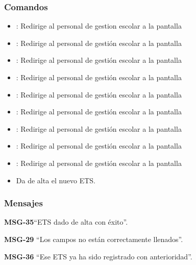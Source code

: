 \subsubsection{Comandos}
\begin{itemize}
	\item {}: Redirige al personal de gestion escolar a la pantalla 
	
	\item {}: Redirige al personal de gestión escolar a la pantalla 
	\item {}: Redirige al personal de gestión escolar a la pantalla 
	
	\item {}: Redirige al personal de gestión escolar a la pantalla 
	\item {}: Redirige al personal de gestión escolar a la pantalla 
	
	\item {}: Redirige al personal de gestión escolar a la pantalla 
	\item {}: Redirige al personal de gestión escolar a la pantalla 
	
	\item {}: Redirige al personal de gestión escolar a la pantalla 
	\item {}: Redirige al personal de gestión escolar a la pantalla 
	
    \item {} Da de alta el nuevo ETS.
\end{itemize}

\subsubsection{Mensajes}

\begin{Citemize}
    \item {\bf MSG-35}{``ETS  dado de alta con éxito''.}
    \item {\bf MSG-29}{ ``Los campos no están correctamente llenados''.}
    \item {\bf MSG-36}{ ``Ese ETS ya ha sido registrado con anterioridad''.}
    
\end{Citemize}

